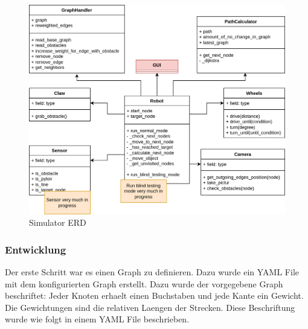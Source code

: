 \begin{figure}[H]
\centering
\includegraphics[width=\textwidth]{assets/informatik-prototyp/simulator/simulator-erd.png}
\caption{Simulator ERD}
\label{fig:simulator-erd}
\end{figure}

\subsubsection{Entwicklung}

Der erste Schritt war es einen Graph zu definieren. Dazu wurde ein YAML File mit dem konfigurierten Graph erstellt. 
Dazu wurde der vorgegebene Graph beschriftet: Jeder Knoten erhaelt einen Buchstaben und jede Kante ein Gewicht. Die Gewichtungen sind die relativen Laengen der Strecken. Diese Beschriftung wurde wie folgt in einem YAML File beschrieben.

